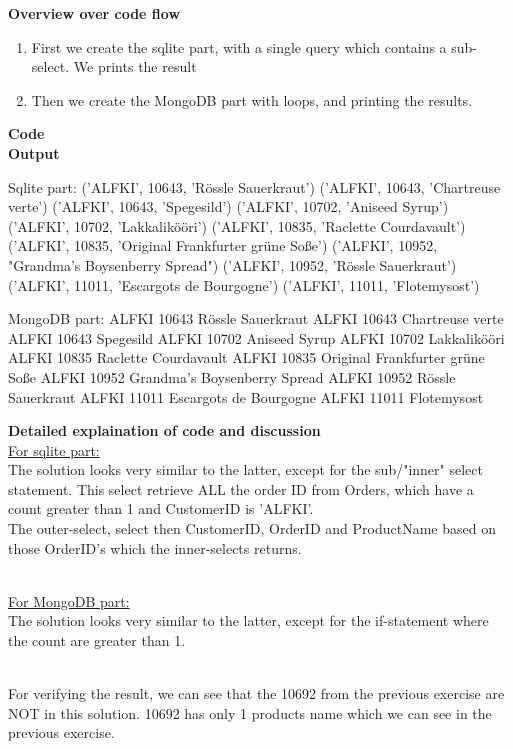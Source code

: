 \documentclass{article}
\newcommand\pythonstyle{\lstset{
language=python,
breaklines=true,
basicstyle=\ttfamily\small,
otherkeywords={1, 2, 3, 4, 5, 6, 7, 8 ,9 , 0, -, =, +, [, ], (, ), \{, \}, :, *, !},             %
keywordstyle=\color{blue},
emph={class, pass, in, for, while, if, is, elif, else, not, and, or, OR
    def, print, exec, break, continue, return},
emphstyle=\color{black}\bfseries,
emph={[2]True, False, None, self},
emphstyle=[2]\color{purple},
emph={[3]from, import, as},
emphstyle=[3]\color{blue},
stringstyle=\color{red},
frame=tb,
showstringspaces=false,
morecomment=[s]{"""}{"""},
commentstyle=\color{gray},
rulesepcolor=\color{blue},
title=\lstname
}}
\newcommand\pythonexternal[2][]{{
\pythonstyle
}}
\begin{document}
\textbf{Overview over code flow}\\

\begin{enumerate}
  \item First we create the sqlite part, with a single query which contains a sub-select. We prints the result 
  \item Then we create the MongoDB part with loops, and printing the results. 
\end{enumerate}

\textbf{Code}\\
\textbf{Output}
\begin{pythonOutput}
Sqlite part:
('ALFKI', 10643, 'Rössle Sauerkraut')
('ALFKI', 10643, 'Chartreuse verte')
('ALFKI', 10643, 'Spegesild')
('ALFKI', 10702, 'Aniseed Syrup')
('ALFKI', 10702, 'Lakkalikööri')
('ALFKI', 10835, 'Raclette Courdavault')
('ALFKI', 10835, 'Original Frankfurter grüne Soße')
('ALFKI', 10952, "Grandma's Boysenberry Spread")
('ALFKI', 10952, 'Rössle Sauerkraut')
('ALFKI', 11011, 'Escargots de Bourgogne')
('ALFKI', 11011, 'Flotemysost')

MongoDB part:
ALFKI 10643 Rössle Sauerkraut
ALFKI 10643 Chartreuse verte
ALFKI 10643 Spegesild
ALFKI 10702 Aniseed Syrup
ALFKI 10702 Lakkalikööri
ALFKI 10835 Raclette Courdavault
ALFKI 10835 Original Frankfurter grüne Soße
ALFKI 10952 Grandma's Boysenberry Spread
ALFKI 10952 Rössle Sauerkraut
ALFKI 11011 Escargots de Bourgogne
ALFKI 11011 Flotemysost

\end{pythonOutput}
\textbf{Detailed explaination of code and discussion}\\
\underline{For sqlite part:}~\\
The solution looks very similar to the latter, except for the sub/"inner" select statement. This select retrieve ALL the order ID from Orders, which have a count greater than 1 and CustomerID is 'ALFKI'. ~\\
The outer-select, select then CustomerID, OrderID and ProductName based on those OrderID's which the inner-selects returns. 

~\\
\underline{For MongoDB part:}~\\
The solution looks very similar to the latter, except for the if-statement where the count are greater than 1. 

~\\
For verifying the result, we can see that the 10692 from the previous exercise are NOT in this solution. 10692 has only 1 products name which we can see in the previous exercise. 
\end{document}
